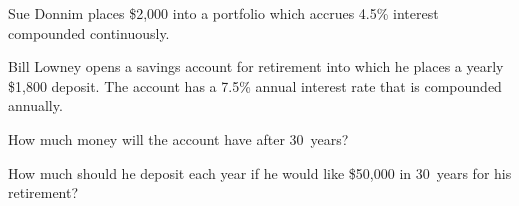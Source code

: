 \documentclass[12pt,letterpaper]{exam}
\begin{document}
\begin{questions}
\newpage
\question[10] Sue Donnim places \$2,000 into a portfolio which accrues 4.5\% interest compounded continuously. \pspace
 
 
 
  

 \newpage
 \question[10] Bill Lowney opens a savings account for retirement into which he places a yearly  \$1,800 deposit. The account has a 7.5\% annual interest rate that is compounded annually. 
        \begin{parts}
        \item How much money will the account have after 30~years? \vfill
        \item How much should he deposit each year if he would like \$50,000 in 30~years for his retirement? \vfill
        \end{parts} 

\end{questions}
\end{document}
